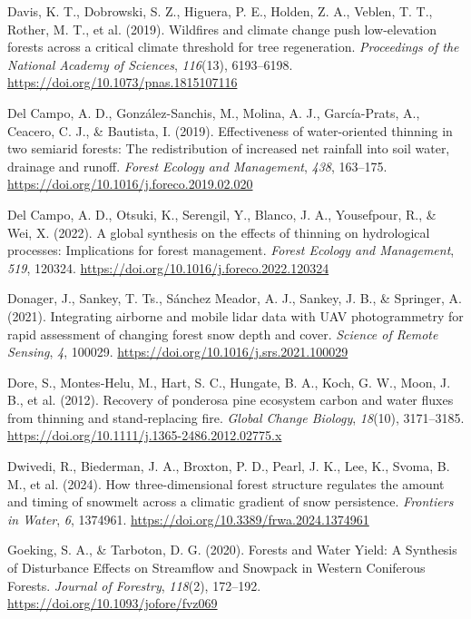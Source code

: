\documentclass[
]{agujournal2019}
\newlength{\cslhangindent}
\newenvironment{CSLReferences}[2] %
 {\begin{list}{}{%
  \setlength{\itemindent}{0pt}
  \setlength{\leftmargin}{0pt}
  \setlength{\parsep}{0pt}
  \ifodd #1
   \setlength{\leftmargin}{\cslhangindent}
   \setlength{\itemindent}{-1\cslhangindent}
  \fi
  \setlength{\itemsep}{#2\baselineskip}}}
 {\end{list}}
\begin{document}
\begin{CSLReferences}{1}{0}
Davis, K. T., Dobrowski, S. Z., Higuera, P. E., Holden, Z. A., Veblen,
T. T., Rother, M. T., et al. (2019). Wildfires and climate change push
low-elevation forests across a critical climate threshold for tree
regeneration. \emph{Proceedings of the National Academy of Sciences},
\emph{116}(13), 6193--6198.
\url{https://doi.org/10.1073/pnas.1815107116}

Del Campo, A. D., González-Sanchis, M., Molina, A. J., García-Prats, A.,
Ceacero, C. J., \& Bautista, I. (2019). Effectiveness of water-oriented
thinning in two semiarid forests: {The} redistribution of increased net
rainfall into soil water, drainage and runoff. \emph{Forest Ecology and
Management}, \emph{438}, 163--175.
\url{https://doi.org/10.1016/j.foreco.2019.02.020}

Del Campo, A. D., Otsuki, K., Serengil, Y., Blanco, J. A., Yousefpour,
R., \& Wei, X. (2022). A global synthesis on the effects of thinning on
hydrological processes: {Implications} for forest management.
\emph{Forest Ecology and Management}, \emph{519}, 120324.
\url{https://doi.org/10.1016/j.foreco.2022.120324}

Donager, J., Sankey, T. Ts., Sánchez Meador, A. J., Sankey, J. B., \&
Springer, A. (2021). Integrating airborne and mobile lidar data with
{UAV} photogrammetry for rapid assessment of changing forest snow depth
and cover. \emph{Science of Remote Sensing}, \emph{4}, 100029.
\url{https://doi.org/10.1016/j.srs.2021.100029}

Dore, S., Montes‐Helu, M., Hart, S. C., Hungate, B. A., Koch, G. W.,
Moon, J. B., et al. (2012). Recovery of ponderosa pine ecosystem carbon
and water fluxes from thinning and stand‐replacing fire. \emph{Global
Change Biology}, \emph{18}(10), 3171--3185.
\url{https://doi.org/10.1111/j.1365-2486.2012.02775.x}

Dwivedi, R., Biederman, J. A., Broxton, P. D., Pearl, J. K., Lee, K.,
Svoma, B. M., et al. (2024). How three-dimensional forest structure
regulates the amount and timing of snowmelt across a climatic gradient
of snow persistence. \emph{Frontiers in Water}, \emph{6}, 1374961.
\url{https://doi.org/10.3389/frwa.2024.1374961}

Goeking, S. A., \& Tarboton, D. G. (2020). Forests and {Water} {Yield}:
{A} {Synthesis} of {Disturbance} {Effects} on {Streamflow} and
{Snowpack} in {Western} {Coniferous} {Forests}. \emph{Journal of
Forestry}, \emph{118}(2), 172--192.
\url{https://doi.org/10.1093/jofore/fvz069}


\end{CSLReferences}
\end{document}
